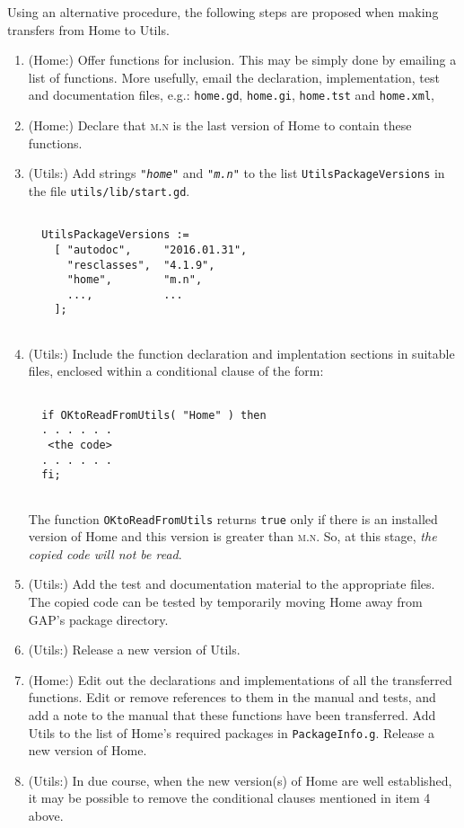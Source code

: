 \documentclass[a4paper,11pt]{report}
\begin{document}
{{ Using an alternative procedure, the following steps are proposed when making
transfers from \textsf{Home} to \textsf{Utils}. 
\begin{enumerate}
\item  (\textsf{Home}:) Offer functions for inclusion. This may be simply done by emailing a list
of functions. More usefully, email the declaration, implementation, test and
documentation files, e.g.: \texttt{home.gd}, \texttt{home.gi}, \texttt{home.tst} and \texttt{home.xml}, 
\item  (\textsf{Home}:) Declare that \textsc{m.n} is the last version of \textsf{Home} to contain these functions. 
\item  (\textsf{Utils}:) Add strings \mbox{\texttt{\mdseries\slshape "home"}} and \mbox{\texttt{\mdseries\slshape "m.n"}} to the list \texttt{UtilsPackageVersions} in the file \texttt{utils/lib/start.gd}. 
\begin{Verbatim}[commandchars=!@|,fontsize=\small,frame=single,label=Example]
  
  UtilsPackageVersions := 
    [ "autodoc",     "2016.01.31", 
      "resclasses",  "4.1.9", 
      "home",        "m.n",
      ...,           ... 
    ];
  
\end{Verbatim}
 
\item  (\textsf{Utils}:) Include the function declaration and implentation sections in suitable
files, enclosed within a conditional clause of the form: 
\begin{Verbatim}[commandchars=!@|,fontsize=\small,frame=single,label=Example]
  
  if OKtoReadFromUtils( "Home" ) then
  . . . . . . 
   <the code> 
  . . . . . . 
  fi;
  
\end{Verbatim}
  The function \texttt{OKtoReadFromUtils} returns \texttt{true} only if there is an installed version of \textsf{Home} and this version is greater than \textsc{m.n}. So, at this stage, \emph{the copied code will not be read}. 
\item  (\textsf{Utils}:) Add the test and documentation material to the appropriate files. The
copied code can be tested by temporarily moving \textsf{Home} away from \textsf{GAP}'s package directory. 
\item  (\textsf{Utils}:) Release a new version of \textsf{Utils}. 
\item  (\textsf{Home}:) Edit out the declarations and implementations of all the transferred
functions. Edit or remove references to them in the manual and tests, and add
a note to the manual that these functions have been transferred. Add \textsf{Utils} to the list of \textsf{Home}'s required packages in \texttt{PackageInfo.g}. Release a new version of \textsf{Home}. 
\item  (\textsf{Utils}:) In due course, when the new version(s) of \textsf{Home} are well established, it may be possible to remove the conditional clauses
mentioned in item 4 above. 
\end{enumerate}
 

}}
\end{document}
